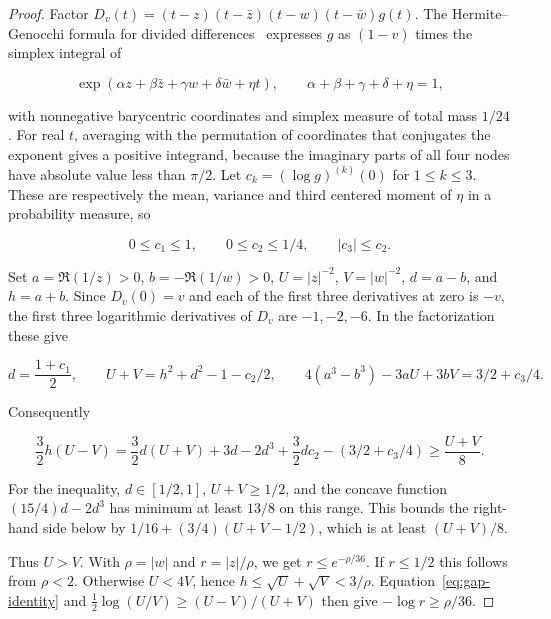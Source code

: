 \documentclass[11pt]{article}
\begin{document}
\begin{proof}

Factor $D_v(t)=(t-z)(t-\bar z)(t-w)(t-\bar w)g(t)$. The Hermite--Genocchi formula for divided differences~\cite{deboor} expresses $g$ as $(1-v)$ times the simplex integral of

\begin{equation*}
\exp(\alpha z+\beta\bar z+\gamma w+\delta\bar w+\eta t),
\qquad \alpha+\beta+\gamma+\delta+\eta=1,
\end{equation*}

with nonnegative barycentric coordinates and simplex measure of total mass $1/24$. For real $t$, averaging with the permutation of coordinates that conjugates the exponent gives a positive integrand, because the imaginary parts of all four nodes have absolute value less than $\pi/2$. Let $c_k=(\log g)^{(k)}(0)$ for $1\le k\le3$. These are respectively the mean, variance and third centered moment of $\eta$ in a probability measure, so

\begin{equation*}
0\le c_1\le1,\qquad 0\le c_2\le1/4,\qquad |c_3|\le c_2.
\end{equation*}

Set $a=\Re(1/z)>0$, $b=-\Re(1/w)>0$, $U=|z|^{-2}$, $V=|w|^{-2}$, $d=a-b$, and $h=a+b$. Since $D_v(0)=v$ and each of the first three derivatives at zero is $-v$, the first three logarithmic derivatives of $D_v$ are $-1,-2,-6$. In the factorization these give

\begin{equation*}
d=\frac{1+c_1}{2},\qquad U+V=h^2+d^2-1-c_2/2,\qquad
4(a^3-b^3)-3aU+3bV=3/2+c_3/4.
\end{equation*}

Consequently

\begin{equation}
\frac32 h(U-V)=\frac32d(U+V)+3d-2d^3+\frac32d c_2-(3/2+c_3/4)
\ge\frac{U+V}{8}.
\label{eq:gap-identity}
\end{equation}

For the inequality, $d\in[1/2,1]$, $U+V\ge1/2$, and the concave function $(15/4)d-2d^3$ has minimum at least $13/8$ on this range. This bounds the right-hand side below by $1/16+(3/4)(U+V-1/2)$, which is at least $(U+V)/8$.

Thus $U>V$. With $\rho=|w|$ and $r=|z|/\rho$, we get $r\le e^{-\rho/36}$. If $r\le1/2$ this follows from $\rho<2$. Otherwise $U<4V$, hence $h\le\sqrt U+\sqrt V<3/\rho$. Equation~\eqref{eq:gap-identity} and $\tfrac12\log(U/V)\ge(U-V)/(U+V)$ then give $-\log r\ge\rho/36$.


\end{proof}
\end{document}
